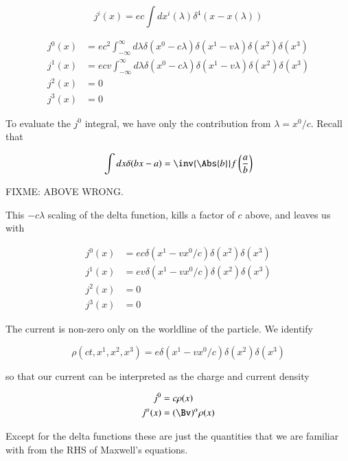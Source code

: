 \begin{equation}\label{eqn:relativisticElectrodynamicsL12:470}
j^i(x) = e c \int dx^i(\lambda) \delta^4 (x - x(\lambda))
\end{equation}

\begin{align}\label{eqn:relativisticElectrodynamicsL12:490}
j^0(x) &= e c^2  \int_{-\infty}^\infty d\lambda \delta(x^0 -  c \lambda) \delta(x^1 -  v \lambda) \delta(x^2) \delta(x^3) \\
j^1(x) &= e c v  \int_{-\infty}^\infty d\lambda \delta(x^0 -  c \lambda) \delta(x^1 -  v \lambda) \delta(x^2) \delta(x^3) \\
j^2(x) &= 0 \\
j^3(x) &= 0
\end{align}

To evaluate the $j^0$ integral, we have only the contribution from $\lambda = x^0/ c$.  Recall that 

\begin{equation}\label{eqn:relativisticElectrodynamicsL12:510}
\int dx \delta( b x - a) = \inv{\Abs{b}} f\left( \frac{a}{b} \right)
\end{equation}

FIXME: ABOVE WRONG.

This $- c\lambda$ scaling of the delta function, kills a factor of $c $ above, and leaves us with

\begin{align}\label{eqn:relativisticElectrodynamicsL12:530}
j^0(x) &= e c \delta(x^1 - v x^0/c) \delta(x^2) \delta(x^3) \\
j^1(x) &= e v \delta(x^1 - v x^0/c) \delta(x^2) \delta(x^3) \\
j^2(x) &= 0 \\
j^3(x) &= 0 
\end{align}

The current is non-zero only on the worldline of the particle.  We identify

\begin{equation}\label{eqn:relativisticElectrodynamicsL12:550}
\rho(ct, x^1, x^2, x^3) = e \delta(x^1 - v x^0/c) \delta(x^2) \delta(x^3) 
\end{equation}

so that our current can be interpreted as the charge and current density 

\begin{align}\label{eqn:relativisticElectrodynamicsL12:570}
j^0 &= c \rho(x) \\
j^\alpha(x) &= (\Bv)^\alpha \rho(x)
\end{align}

Except for the delta functions these are just the quantities that we are familiar with from the RHS of Maxwell's equations.

\EndArticle
